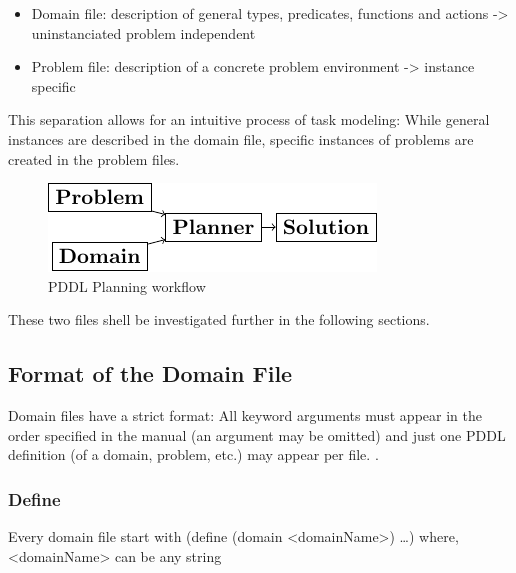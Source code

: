 \documentclass[11pt]{article}
\begin{document}
\begin{itemize}
\item Domain file: description of general types, predicates, functions
and actions -> uninstanciated problem independent
\item Problem file: description of a concrete problem environment -> instance speciﬁc
\end{itemize}

This separation allows for an intuitive process of task modeling:
While general instances are described in the domain file, specific
instances of problems are created in the problem files.

\begin{figure}[htb]
\centering
\includegraphics[width=.9\linewidth]{../img/pddl-workflow.pdf}
\caption{\label{fig:workflow}PDDL Planning workflow}
\end{figure}

These two files shell be investigated further in the following
sections.

\subsection{Format of the Domain File}
\label{sec-3-1}
Domain files have a strict format: All keyword arguments must appear
in the order specified in the manual (an argument may be omitted) and
just one PDDL definition (of a domain, problem, etc.) may appear per
file. \cite[6]{fox2003pddl2}.

\begin{center}
\end{center}

\subsubsection{Define}
\label{sec-3-1-1}
Every domain file start with (define (domain <domainName>) \ldots{}) where,
<domainName> can be any string
\end{document}

